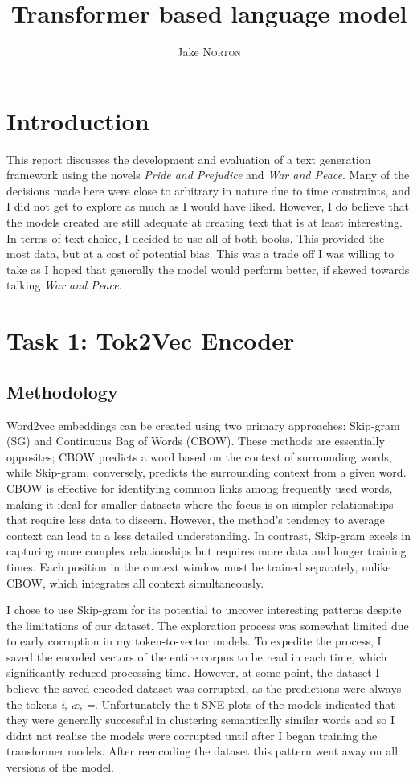 \documentclass[12pt]{article} \usepackage{COSC420style} \usepackage{soul}
\title{Transformer based language model}
\author{Jake \textsc{Norton}} \studentid{5695756}
\begin{document}
\maketitle

\section{Introduction}

This report discusses the development and evaluation of a text generation framework using the novels
\textit{Pride and Prejudice} and \textit{War and Peace}.  Many of the decisions made here were close
to arbitrary in nature due to time constraints, and I did not get to explore as much as I would have
liked. However, I do believe that the models created are still adequate at creating text that is at
least interesting. In terms of text choice, I decided to use all of both books. This provided the
most data, but at a cost of potential bias. This was a trade off I was willing to take as I hoped
that generally the model would perform better, if skewed towards talking \textit{War and Peace}.
\section{Task 1: Tok2Vec Encoder}

\subsection{Methodology}

Word2vec embeddings can be created using two primary approaches: Skip-gram (SG) and Continuous Bag
of Words (CBOW). These methods are essentially opposites; CBOW predicts a word based on the context
of surrounding words, while Skip-gram, conversely, predicts the surrounding context from a given
word. CBOW is effective for identifying common links among frequently used words, making it ideal
for smaller datasets where the focus is on simpler relationships that require less data to discern.
However, the method's tendency to average context can lead to a less detailed understanding. In
contrast, Skip-gram excels in capturing more complex relationships but requires more data and longer
training times. Each position in the context window must be trained separately, unlike CBOW, which
integrates all context simultaneously.

I chose to use Skip-gram for its potential to uncover interesting patterns despite the limitations
of our dataset. The exploration process was somewhat limited due to early corruption in my
token-to-vector models. To expedite the process, I saved the encoded vectors of the entire corpus to
be read in each time, which significantly reduced processing time. However, at some point, the
dataset I believe the saved encoded dataset was corrupted, as the predictions were always the tokens \textit{i},
\textit{\ae}, \textit{=}. Unfortunately the t-SNE plots of the models indicated that they
were generally successful in clustering semantically similar words and so I didnt not realise the
models were corrupted until after I began training the transformer models. After reencoding the
dataset this pattern went away on all versions of the model.
\end{document}
